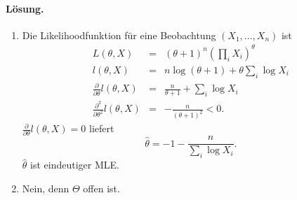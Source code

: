 \paragraph*{Lösung.}
\begin{enumerate}

    \item Die Likelihoodfunktion für eine Beobachtung $(X_1,\ldots,X_n)$ ist 
        \begin{eqnarray}
            L(\theta,X) &=& \left( \theta+1 \right)^n \left( \prod_i X_i \right)^{\theta}  \\
            l(\theta,X) &=& n \log \left( \theta+1 \right)  + \theta \sum_{i}^{} \log X_i \\
            \frac{\partial}{\partial \theta} l(\theta,X)&=& \frac{n}{\theta+1} + \sum_{i}^{} \log X_i \\
            \frac{\partial^2}{\partial \theta^2} l(\theta,X) &=& 
            - \frac{n}{\left( \theta+1 \right)^2} < 0.
        \end{eqnarray}
        $\frac{\partial}{\partial \theta} l(\theta,X)=0$ liefert
        \begin{equation}
            \hat\theta = -1 - \frac{n}{\sum_{i}^{} \log X_i}.
        \end{equation}
        $\hat\theta$ ist eindeutiger MLE.

    \item Nein, denn $\Theta$ offen ist.

\end{enumerate}



